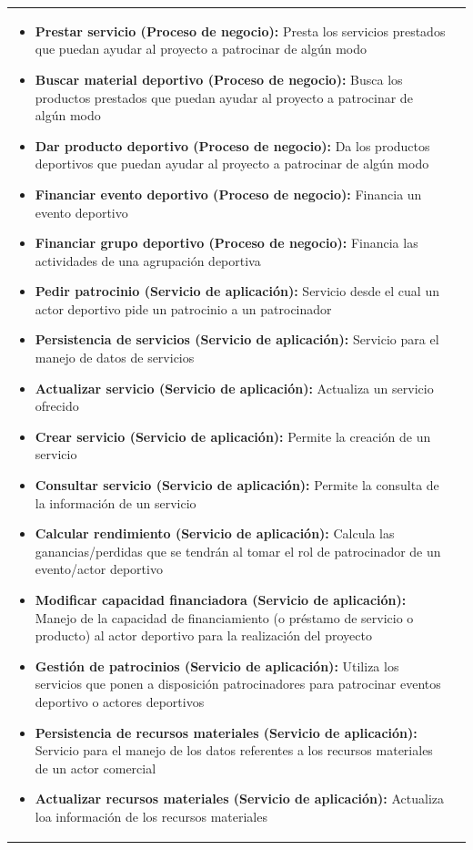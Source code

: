 \begin{table}[!htb]
\begin{center}
{\begin{tabular}{|p{7cm}|p{4cm}|}
\begin{itemize}
				\item \textbf{Prestar servicio (Proceso de negocio):} Presta los servicios prestados que puedan ayudar al proyecto a patrocinar de algún modo
				\item \textbf{Buscar material deportivo (Proceso de negocio):} Busca los productos prestados que puedan ayudar al proyecto a patrocinar de algún modo
				\item \textbf{Dar producto deportivo (Proceso de negocio):} Da los productos deportivos que puedan ayudar al proyecto a patrocinar de algún modo
				\item \textbf{Financiar evento deportivo (Proceso de negocio):} Financia un evento deportivo
				\item \textbf{Financiar grupo deportivo (Proceso de negocio):} Financia las actividades de una agrupación deportiva
				\item \textbf{Pedir patrocinio (Servicio de aplicación):} Servicio desde el cual un actor deportivo pide un patrocinio a un patrocinador
				\item \textbf{Persistencia de servicios (Servicio de aplicación):} Servicio para el manejo de datos de servicios
				\item \textbf{Actualizar servicio (Servicio de aplicación):} Actualiza un servicio ofrecido
				\item \textbf{Crear servicio (Servicio de aplicación):} Permite la creación de un servicio
				\item \textbf{Consultar servicio (Servicio de aplicación):} Permite la consulta de la información de un servicio
				\item \textbf{Calcular rendimiento (Servicio de aplicación):} Calcula las ganancias/perdidas que se tendrán al tomar el rol de patrocinador de un evento/actor deportivo
				\item \textbf{Modificar capacidad financiadora (Servicio de aplicación):} Manejo de la capacidad de financiamiento (o préstamo de servicio o producto) al actor deportivo para la realización del proyecto
				\item \textbf{Gestión de patrocinios (Servicio de aplicación):} Utiliza los servicios que ponen a disposición patrocinadores para patrocinar eventos deportivo o actores deportivos
				\item \textbf{Persistencia de recursos materiales (Servicio de aplicación):} Servicio para el manejo de los datos referentes a los recursos materiales de un actor comercial
				\item \textbf{Actualizar recursos materiales (Servicio de aplicación):} Actualiza loa información de los recursos materiales

\end{itemize}
\end{tabular}}
\end{center}
\end{table}
